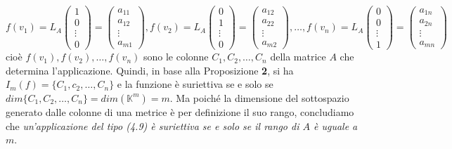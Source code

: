 \begin{equation*}
  f(v_1)=L_A
  \begin{pmatrix}
    1 \\
    0 \\
    \vdots\\
    0
  \end{pmatrix}=
  \begin{pmatrix}
    a_{11}\\
    a_{12}\\
    \vdots\\
    a_{m1}
  \end{pmatrix},
  f(v_2)= L_A
   \begin{pmatrix}
    0 \\
    1 \\
    \vdots\\
    0
   \end{pmatrix}=
   \begin{pmatrix}
    a_{12}\\
    a_{22}\\
    \vdots\\
    a_{m2}
   \end{pmatrix}, \dots, f(v_n)=
   L_A
   \begin{pmatrix}
    0\\
    0\\
    \vdots\\
    1
   \end{pmatrix}=
   \begin{pmatrix}
    a_{1n}\\
    a_{2n}\\
    \vdots\\
    a_{mn}    
   \end{pmatrix}
\end{equation*}
cioè $f(v_1),f(v_2),\dots,f(v_n)$ sono le colonne $C_1,C_2,\dots,C_n$ della matrice $A$ che determina
l'applicazione. Quindi, in base alla Proposizione \textbf{2}, si ha $I_m(f)=\{C_1,c_2,\dots,C_n\}$ e la funzione
è suriettiva se e solo se $dim\{C_1,C_2,\dots,C_n\}=dim(\mathds{K}^m)=m$. Ma poiché la dimensione del sottospazio
generato dalle colonne di una metrice è per definizione il suo rango, concludiamo che \textit{un'applicazione
  del tipo (4.9) è suriettiva se e solo se il rango di $A$ è uguale a $m$}.

